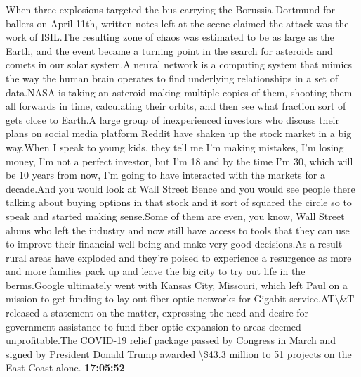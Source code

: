 \documentclass{article}%
\begin{document}
When three explosions targeted the bus carrying the Borussia Dortmund for ballers on April 11th, written notes left at the scene claimed the attack was the work of ISIL.The resulting zone of chaos was estimated to be as large as the Earth, and the event became a turning point in the search for asteroids and comets in our solar system.A neural network is a computing system that mimics the way the human brain operates to find underlying relationships in a set of data.NASA is taking an asteroid making multiple copies of them, shooting them all forwards in time, calculating their orbits, and then see what fraction sort of gets close to Earth.A large group of inexperienced investors who discuss their plans on social media platform Reddit have shaken up the stock market in a big way.When I speak to young kids, they tell me I'm making mistakes, I'm losing money, I'm not a perfect investor, but I'm 18 and by the time I'm 30, which will be 10 years from now, I'm going to have interacted with the markets for a decade.And you would look at Wall Street Bence and you would see people there talking about buying options in that stock and it sort of squared the circle so to speak and started making sense.Some of them are even, you know, Wall Street alums who left the industry and now still have access to tools that they can use to improve their financial well{-}being and make very good decisions.As a result rural areas have exploded and they're poised to experience a resurgence as more and more families pack up and leave the big city to try out life in the berms.Google ultimately went with Kansas City, Missouri, which left Paul on a mission to get funding to lay out fiber optic networks for Gigabit service.AT\textbackslash{}\&T released a statement on the matter, expressing the need and desire for government assistance to fund fiber optic expansion to areas deemed unprofitable.The COVID{-}19 relief package passed by Congress in March and signed by President Donald Trump awarded \textbackslash{}\$43.3 million to 51 projects on the East Coast alone.%
\textbf{17:05:52}%
\newline%
\end{document}
